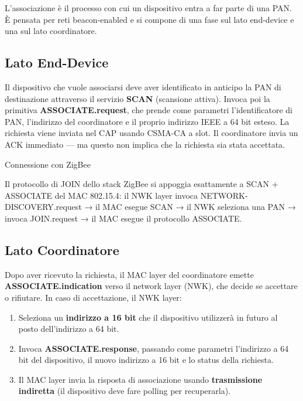 \documentclass[
  italian,
  openany]{book}
\providecommand{\tightlist}{%
  \setlength{\itemsep}{0pt}\setlength{\parskip}{0pt}}
\begin{document}
L'associazione è il processo con cui un dispositivo entra a far parte di
una PAN. È pensata per reti beacon-enabled e si compone di una fase sul
lato end-device e una sul lato coordinatore.

\subsection{Lato End-Device}\label{lato-end-device}

Il dispositivo che vuole associarsi deve aver identificato in anticipo
la PAN di destinazione attraverso il servizio \textbf{SCAN} (scansione
attiva). Invoca poi la primitiva \textbf{ASSOCIATE.request}, che prende
come parametri l'identificatore di PAN, l'indirizzo del coordinatore e
il proprio indirizzo IEEE a 64 bit esteso. La richiesta viene inviata
nel CAP usando CSMA-CA a slot. Il coordinatore invia un ACK immediato
--- ma questo non implica che la richiesta sia stata accettata.

\begin{calloutnote}{Connessione con ZigBee}

Il protocollo di JOIN dello stack ZigBee si appoggia esattamente a SCAN
+ ASSOCIATE del MAC 802.15.4: il NWK layer invoca
NETWORK-DISCOVERY.request → il MAC esegue SCAN → il NWK seleziona una
PAN → invoca JOIN.request → il MAC esegue il protocollo ASSOCIATE.

\end{calloutnote}

\subsection{Lato Coordinatore}\label{lato-coordinatore}

Dopo aver ricevuto la richiesta, il MAC layer del coordinatore emette
\textbf{ASSOCIATE.indication} verso il network layer (NWK), che decide
se accettare o rifiutare. In caso di accettazione, il NWK layer:

\begin{enumerate}
\def\labelenumi{\arabic{enumi}.}
\tightlist
\item
  Seleziona un \textbf{indirizzo a 16 bit} che il dispositivo utilizzerà
  in futuro al posto dell'indirizzo a 64 bit.
\item
  Invoca \textbf{ASSOCIATE.response}, passando come parametri
  l'indirizzo a 64 bit del dispositivo, il nuovo indirizzo a 16 bit e lo
  status della richiesta.
\item
  Il MAC layer invia la risposta di associazione usando
  \textbf{trasmissione indiretta} (il dispositivo deve fare polling per
  recuperarla).
\end{enumerate}
\end{document}
